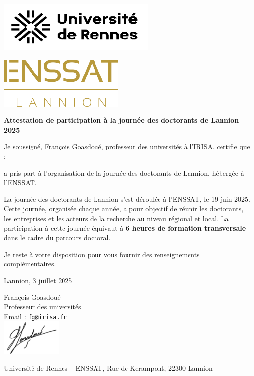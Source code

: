 \documentclass[12pt,a4paper]{article}
\begin{document}
\begin{minipage}[t]{0.45\textwidth}
    \includegraphics[height=2.5cm]{logo_rennes.png}
\end{minipage}
\hfill
\begin{minipage}[t]{0.45\textwidth}
    \raggedleft
    \includegraphics[height=2.5cm]{logo_enssat.png}
\end{minipage}

\vspace{1.5cm}

\begin{center}
    {\LARGE\bfseries Attestation de participation à la journée des doctorants de Lannion 2025}
\end{center}

\vspace{1.5cm}

Je soussigné, François Goasdoué, professeur des universités à l'IRISA, certifie que :\\

\vspace{0.5cm}


\vspace{0.5cm}

a pris part à l'organisation de la journée des doctorants de Lannion, hébergée à l’ENSSAT.

La journée des doctorants de Lannion s’est déroulée à l’ENSSAT, le 19 juin 2025. Cette journée, organisée chaque année, a pour objectif de réunir les doctorants, les entreprises et les acteurs de la recherche au niveau régional et local. La participation à cette journée équivaut à \textbf{6 heures de formation transversale} dans le cadre du parcours doctoral.


\vspace{1cm}

Je reste à votre disposition pour vous fournir des renseignements complémentaires.

\vspace{1.5cm}

\begin{flushright}
Lannion, 3 juillet 2025

François Goasdoué\\
Professeur des universités\\
Email : \texttt{fg@irisa.fr}\\
\includegraphics[height=1.75cm]{signature.png}


\end{flushright}

\vfill

{\small
Université de Rennes – ENSSAT, Rue de Kerampont, 22300 Lannion \\
}
\end{document}
